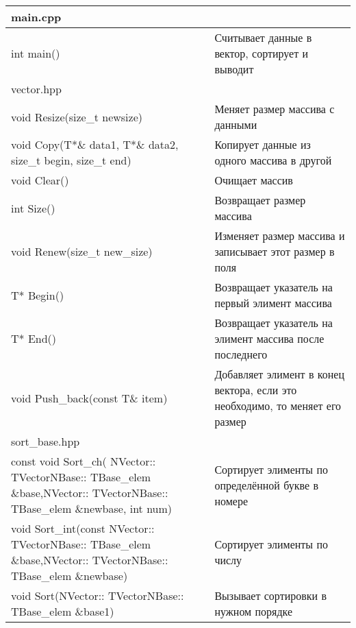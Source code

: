 \pagebreak

\begin{longtable}{|p{7.5cm}|p{7.5cm}|}
\hline
\rowcolor{lightgray}
\multicolumn{2}{|c|} {main.cpp}\\
\hline
int main()&Считывает данные в вектор, сортирует и выводит\\
\hline
\rowcolor{lightgray}
\multicolumn{2}{|c|} {vector.hpp}\\
\hline
void Resize(size\_t newsize)&Меняет размер массива с данными\\
\hline
void Copy(T*\& data1, T*\& data2, size\_t begin, size\_t end)&Копирует данные из одного массива в другой\\
\hline
void Clear()&Очищает массив\\
\hline
int Size()&Возвращает размер массива\\
\hline
void Renew(size\_t new\_size)&Изменяет размер массива и записывает этот размер в поля\\
\hline
T* Begin()&Возвращает указатель на первый элимент массива\\
\hline
T* End()&Возвращает указатель на элимент массива после последнего\\
\hline
void Push\_back(const T\& item)&Добавляет элимент в конец вектора, если это необходимо, то меняет его размер\\
\hline
\rowcolor{lightgray}
\multicolumn{2}{|c|} {sort\_base.hpp}\\
\hline
const void Sort\_ch( NVector:: TVectorNBase:: TBase\_elem \&base,NVector:: TVectorNBase:: TBase\_elem \&newbase, int num)&Сортирует элименты по определённой букве в номере\\
\hline
void Sort\_int(const NVector:: TVectorNBase:: TBase\_elem \&base,NVector:: TVectorNBase:: TBase\_elem \&newbase)&Сортирует элименты по числу\\
\hline
void Sort(NVector:: TVectorNBase:: TBase\_elem \&base1)&	Вызывает сортировки в нужном порядке\\
\hline
\end{longtable}

\pagebreak

